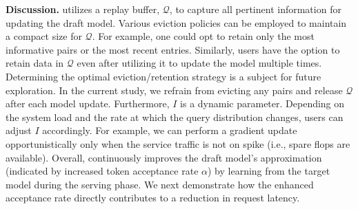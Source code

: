 {\bf Discussion.} 
\tool utilizes a replay buffer, $\mathcal{Q}$, to capture all pertinent information for updating the draft model. 
Various eviction policies can be employed to maintain a compact size for $\mathcal{Q}$. 
For example, one could opt to retain only the most informative pairs or the most recent entries. 
Similarly, users have the option to retain data in $\mathcal{Q}$
even after utilizing it to update the model multiple times.
Determining the optimal eviction/retention strategy is a subject for future exploration. 
In the current study, we refrain from evicting any pairs and release $\mathcal{Q}$ after each model update.
Furthermore, $I$ is a dynamic parameter. Depending on the system load and the rate at which the query
distribution changes, users can adjust $I$ accordingly.
For example, we can perform a gradient update opportunistically only when the service traffic is not on spike (i.e., spare flops are available).
Overall, \tool continuously improves the draft model's approximation (indicated by increased token acceptance rate $\alpha$) 
by learning from the target model during the serving phase. We next demonstrate how the enhanced acceptance rate directly 
contributes to a reduction in request latency.




